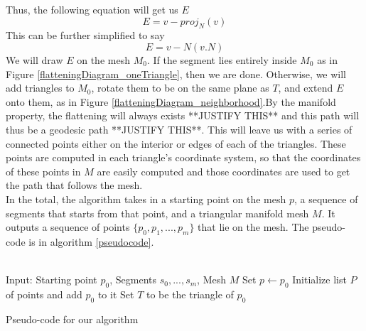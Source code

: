 Thus, the following equation will get us $E$
\[
E = v - proj_N(v)
\]
This can be further simplified to say
\[
E = v - N(v.N)
\]
We will draw $E$ on the mesh $M_0$. If the segment lies entirely inside $M_0$ as in Figure \ref{flatteningDiagram_oneTriangle}, then we are done. Otherwise, we will add triangles to $M_0$, rotate them to be on the same plane as $T$, and extend $E$ onto them, as in Figure \ref{flatteningDiagram_neighborhood}.By the manifold property, the flattening will always exists **JUSTIFY THIS** and this path will thus be a geodesic path **JUSTIFY THIS**. This will leave us with a series of connected points either on the interior or edges of each of the triangles. These points are computed in each triangle's coordinate system, so that the coordinates of these points in $M$ are easily computed and those coordinates are used to get the path that follows the mesh.\\
In the total, the algorithm takes in a starting point on the mesh $p$, a sequence of segments that starts from that point, and a triangular manifold mesh $M$. It outputs a sequence of points $\{ p_0, p_1, ... , p_m\}$ that lie on the mesh. The pseudo-code is in algorithm \ref{pseudocode}.\\
\\
\begin{algorithm}[t]
Input: Starting point $p_0$, Segments $s_0,...,s_m$, Mesh $M$\;
Set $p \leftarrow p_0$ \;
Initialize list $P$ of points and add $p_0$ to it \;
Set $T$ to be the triangle of $p_0$ \;
\caption{Pseudo-code for our algorithm}
\label{pseudocode}
\end{algorithm}

